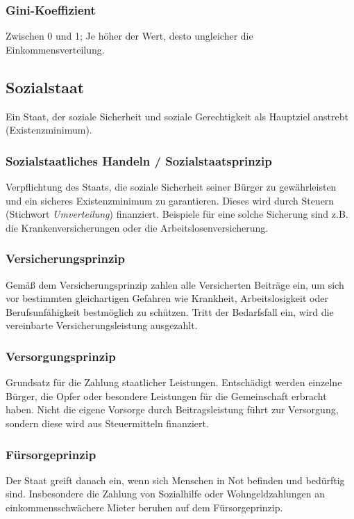 \documentclass{article}
\begin{document}
	\subsubsection{Gini-Koeffizient}
	Zwischen 0 und 1; Je höher der Wert, desto ungleicher die Einkommensverteilung.

	\subsection{Sozialstaat}
	Ein Staat, der soziale Sicherheit und soziale Gerechtigkeit als Hauptziel anstrebt (Existenzminimum).

	\subsubsection{Sozialstaatliches Handeln / Sozialstaatsprinzip}
	Verpflichtung des Staats, die soziale Sicherheit seiner Bürger zu gewährleisten und ein sicheres Existenzminimum zu garantieren. Dieses wird durch Steuern (Stichwort \textit{Umverteilung}) finanziert. Beispiele für eine solche Sicherung sind z.B. die Krankenversicherungen oder die Arbeitslosenversicherung.

	\subsubsection{Versicherungsprinzip}
	Gemäß dem Versicherungsprinzip zahlen alle Versicherten Beiträge ein, um sich vor bestimmten gleichartigen Gefahren wie Krankheit, Arbeitslosigkeit oder Berufsunfähigkeit bestmöglich zu schützen. Tritt der Bedarfsfall ein, wird die vereinbarte Versicherungsleistung ausgezahlt.

	\subsubsection{Versorgungsprinzip}
	Grundsatz für die Zahlung staatlicher Leistungen. Entschädigt werden einzelne Bürger, die Opfer oder besondere Leistungen für die Gemeinschaft erbracht haben. Nicht die eigene Vorsorge durch Beitragsleistung führt zur Versorgung, sondern diese wird aus Steuermitteln finanziert.

	\subsubsection{Fürsorgeprinzip}
	Der Staat greift danach ein, wenn sich Menschen in Not befinden und bedürftig sind. Insbesondere die Zahlung von Sozialhilfe oder Wohngeldzahlungen an einkommensschwächere Mieter beruhen auf dem Fürsorgeprinzip.
\end{document}
